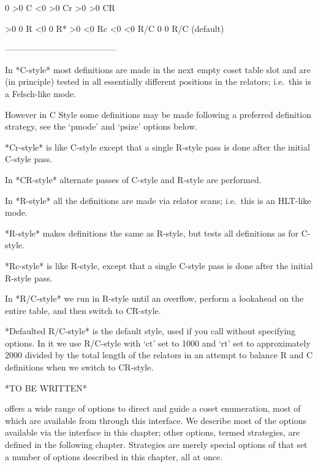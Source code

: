    0           >0         C
  <0           >0         Cr
  >0           >0         CR

  >0            0         R
  <0            0         R*
  >0           <0         Rc
  <0           <0         R/C
   0            0         R/C (default)

---------------------------------------
\endtt

In *C-style*  most definitions are made in the  next empty coset table
slot  and  are (in  principle)  tested  in  all essentially  different
positions in the relators; i.e.~this is a Felsch-like mode.

However in C Style some  definitions may be made following a preferred
definition strategy, see the `pmode' and `psize' options below.

*Cr-style* is like  C-style except that a single R-style  pass is done
after the initial C-style pass.

In *CR-style* alternate passes of C-style and R-style are performed.

In *R-style*  all   the  definitions  are   made  via  relator  scans; 
i.e.~this is an HLT-like mode.

*R\*-style*  makes  definitions the  same as  R-style,  but  tests all
definitions as for C-style.

*Rc-style* is like R-style, except  that a single C-style pass is done
after the initial R-style pass.

In  *R/C-style*  we  run  in  R-style  until  an  overflow, perform  a
lookahead on the entire table, and then switch to CR-style.

*Defaulted R/C-style*  is the default  style, used if  you call {\ACE}
without specifying  options. In it we  use R/C-style with  `ct' set to
1000 and `rt' set to  approximately $2000$ divided by the total length
of the relators  in an attempt to balance R and  C definitions when we
switch to CR-style.


*TO BE WRITTEN*



{\ACE} offers  a wide  range of  options to direct  and guide  a coset
enumeration,  most of  which are  available from  {\GAP}  through this
interface. We describe most of the options available via the interface
in this chapter; other options, termed strategies, are defined in  the
following chapter.  Strategies  are  merely special options of  {\ACE}
that set a number of options described in this chapter,  all  at once.


